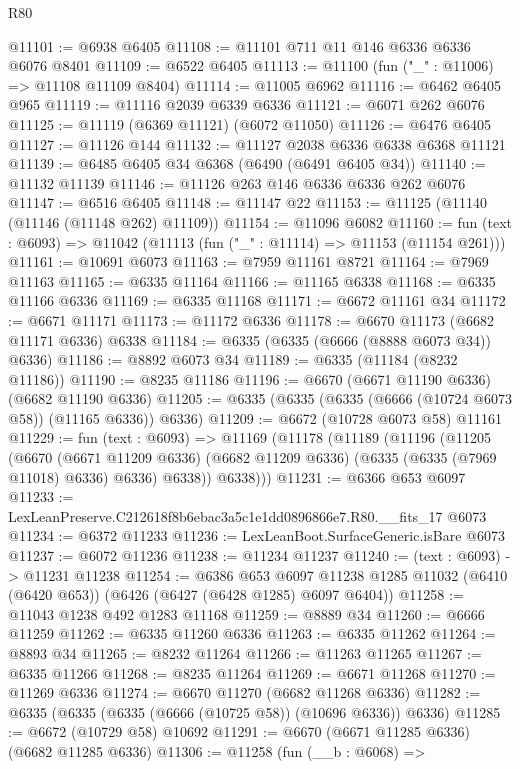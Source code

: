 \begin{lexlean}{R80}
\begin{coremodule}
@11101 := @6938 @6405
@11108 := @11101 @711 @11 @146 @6336 @6336 @6076 @8401
@11109 := @6522 @6405
@11113 := @11100 (fun ("_" : @11006) => @11108 @11109 @8404)
@11114 := @11005 @6962
@11116 := @6462 @6405 @965
@11119 := @11116 @2039 @6339 @6336
@11121 := @6071 @262 @6076
@11125 := @11119 (@6369 @11121) (@6072 @11050)
@11126 := @6476 @6405
@11127 := @11126 @144
@11132 := @11127 @2038 @6336 @6338 @6368 @11121
@11139 := @6485 @6405 @34 @6368 (@6490 (@6491 @6405 @34))
@11140 := @11132 @11139
@11146 := @11126 @263 @146 @6336 @6336 @262 @6076
@11147 := @6516 @6405
@11148 := @11147 @22
@11153 := @11125 (@11140 (@11146 (@11148 @262) @11109))
@11154 := @11096 @6082
@11160 := fun (text : @6093) => @11042 (@11113 (fun ("_" : @11114) => @11153 (@11154 @261)))
@11161 := @10691 @6073
@11163 := @7959 @11161 @8721
@11164 := @7969 @11163
@11165 := @6335 @11164
@11166 := @11165 @6338
@11168 := @6335 @11166 @6336
@11169 := @6335 @11168
@11171 := @6672 @11161 @34
@11172 := @6671 @11171
@11173 := @11172 @6336
@11178 := @6670 @11173 (@6682 @11171 @6336) @6338
@11184 := @6335 (@6335 (@6666 (@8888 @6073 @34)) @6336)
@11186 := @8892 @6073 @34
@11189 := @6335 (@11184 (@8232 @11186))
@11190 := @8235 @11186
@11196 := @6670 (@6671 @11190 @6336) (@6682 @11190 @6336)
@11205 := @6335 (@6335 (@6335 (@6666 (@10724 @6073 @58)) (@11165 @6336)) @6336)
@11209 := @6672 (@10728 @6073 @58) @11161
@11229 := fun (text : @6093) =>
  @11169
    (@11178
      (@11189
        (@11196
          (@11205
            (@6670
              (@6671 @11209 @6336)
              (@6682 @11209 @6336)
              (@6335 (@6335 (@7969 @11018) @6336) @6336)
              @6338))
          @6338)))
@11231 := @6366 @653 @6097
@11233 := LexLeanPreserve.C212618f8b6ebac3a5c1e1dd0896866e7.R80.__fits_17 @6073
@11234 := @6372 @11233
@11236 := LexLeanBoot.SurfaceGeneric.isBare @6073
@11237 := @6072 @11236
@11238 := @11234 @11237
@11240 := (text : @6093) -> @11231 @11238
@11254 := @6386
    @653
    @6097
    @11238
    @1285
    @11032
    (@6410 (@6420 @653))
    (@6426 (@6427 (@6428 @1285) @6097 @6404))
@11258 := @11043 @1238 @492 @1283 @11168
@11259 := @8889 @34
@11260 := @6666 @11259
@11262 := @6335 @11260 @6336
@11263 := @6335 @11262
@11264 := @8893 @34
@11265 := @8232 @11264
@11266 := @11263 @11265
@11267 := @6335 @11266
@11268 := @8235 @11264
@11269 := @6671 @11268
@11270 := @11269 @6336
@11274 := @6670 @11270 (@6682 @11268 @6336)
@11282 := @6335 (@6335 (@6335 (@6666 (@10725 @58)) (@10696 @6336)) @6336)
@11285 := @6672 (@10729 @58) @10692
@11291 := @6670 (@6671 @11285 @6336) (@6682 @11285 @6336)
@11306 := @11258
    (fun (__b : @6068) =>

\end{coremodule}
\end{lexlean}
